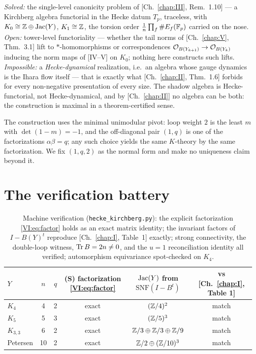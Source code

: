 \begin{remark}\label{VI:rem:scope}
\emph{Solved:} the single-level canonicity problem of [Ch.~\ref{chap:III}, Rem.~1.10] --- a
Kirchberg algebra functorial in the Hecke datum $T_p$, traceless, with
$K_0\cong\mathbb{Z}\oplus\operatorname{Jac}(Y)$, $K_1\cong\mathbb{Z}$, the torsion order
$\frac1n\prod_f\#E_f(\mathbb{F}_p)$ carried on the nose. \emph{Open:} tower-level
functoriality --- whether the tail norms of [Ch.~\ref{chap:V}, Thm.~3.1] lift to
$*$-homomorphisms or correspondences
$\mathcal{O}_{B(Y_{k+1})}\to\mathcal{O}_{B(Y_k)}$ inducing the norm maps of [IV--V] on $K_0$; nothing
here constructs such lifts. \emph{Impossible:} a \emph{Hecke-dynamical} realization,
i.e.\ an algebra whose gauge dynamics is the Ihara flow itself --- that is exactly
what [Ch.~\ref{chap:II}, Thm.~1.6] forbids for every non-negative presentation of every size. The
shadow algebra is Hecke-functorial, not Hecke-dynamical, and by [Ch.~\ref{chap:II}] no algebra can
be both: the construction is maximal in a theorem-certified sense.
\end{remark}

\begin{remark}[Normalization]\label{VI:rem:norm}
The construction uses the minimal unimodular pivot: loop weight $2$ is the least $m$
with $\det(1-m)=-1$, and the off-diagonal pair $(1,q)$ is one of the factorizations
$\alpha\beta=q$; any such choice yields the same $K$-theory by the same
factorization. We fix $(1,q,2)$ as the normal form and make no uniqueness claim
beyond it.
\end{remark}

\section{The verification battery}\label{VI:sec:battery}

\begin{table}[ht]
\centering\small
\renewcommand{\arraystretch}{1.2}
\begin{tabular}{lccccc}
\toprule
$Y$ & $n$ & $q$ & (S) factorization \eqref{VI:eq:factor} & $\operatorname{Jac}(Y)$ from
$\mathrm{SNF}(I-B^t)$ & vs [Ch.~\ref{chap:I}, Table 1]\\
\midrule
$K_4$      & 4  & 2 & exact & $(\mathbb{Z}/4)^2$                 & match\\
$K_5$      & 5  & 3 & exact & $(\mathbb{Z}/5)^3$                 & match\\
$K_{3,3}$  & 6  & 2 & exact & $\mathbb{Z}/3\oplus\mathbb{Z}/3\oplus\mathbb{Z}/9$ & match\\
Petersen   & 10 & 2 & exact & $\mathbb{Z}/2\oplus(\mathbb{Z}/10)^3$      & match\\
\bottomrule
\end{tabular}
\medskip
\caption{Machine verification (\texttt{hecke\_kirchberg.py}): the explicit
factorization \eqref{VI:eq:factor} holds as an exact matrix identity; the invariant
factors of $I-B(Y)^t$ reproduce [Ch.~\ref{chap:I}, Table~1] exactly; strong connectivity, the
double-loop witness, $\operatorname{Tr} B=2n\neq0$, and the $u{=}1$ reconciliation identity all
verified; automorphism equivariance spot-checked on $K_4$.}
\label{VI:tab:battery}
\end{table}

